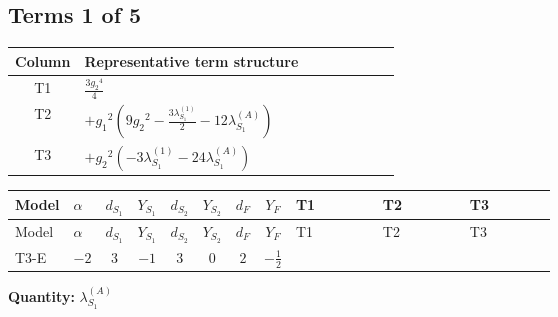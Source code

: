 \documentclass[8pt]{article}
\begin{document}
\begin{landscape}
\subsection*{Terms 1 of 5}
\begin{center}
\begin{tabular}{@{}c >{\raggedright\arraybackslash}p{0.82\linewidth}@{}}
\toprule
Column & Representative term structure \\
\midrule
T1 & \(\displaystyle \frac{3 {g_2}^4}{4}\) \\
\midrule
T2 & \(\displaystyle +{g_1}^2 \left(9 {g_2}^2-\frac{3 {\lambda_{S_1}^{(1)}}}{2}-12 {\lambda_{S_1}^{(A)}}\right)\) \\
\midrule
T3 & \(\displaystyle +{g_2}^2 (-3 {\lambda_{S_1}^{(1)}}-24 {\lambda_{S_1}^{(A)}})\) \\
\midrule
\bottomrule
\end{tabular}
\end{center}
\smallskip
\tiny
\begin{longtable}{@{}llcccccc >{\raggedright\arraybackslash}p{0.21\linewidth} >{\raggedright\arraybackslash}p{0.21\linewidth} >{\raggedright\arraybackslash}p{0.21\linewidth}@{}}
\toprule
Model & $\alpha$ & $d_{S_1}$ & $Y_{S_1}$ & $d_{S_2}$ & $Y_{S_2}$ & $d_F$ & $Y_F$ & T1 & T2 & T3 \\
\midrule
\endfirsthead
\toprule
Model & $\alpha$ & $d_{S_1}$ & $Y_{S_1}$ & $d_{S_2}$ & $Y_{S_2}$ & $d_F$ & $Y_F$ & T1 & T2 & T3 \\
\midrule
\endhead
T3-E & $-2$ & $3$ & $-1$ & $3$ & $0$ & $2$ & $-\frac{1}{2}$ & \scriptsize\adjustbox{max width=\linewidth}{$\begin{gathered} \frac{3 {g_2}^4}{4}\end{gathered}$} & \scriptsize\adjustbox{max width=\linewidth}{$\begin{gathered} +{g_1}^2 \left(9 {g_2}^2-\frac{3 {\lambda_{S_1}^{(1)}}}{2}-12 {\lambda_{S_1}^{(A)}}\right)\end{gathered}$} & \scriptsize\adjustbox{max width=\linewidth}{$\begin{gathered} +{g_2}^2 (-3 {\lambda_{S_1}^{(1)}}-24 {\lambda_{S_1}^{(A)}})\end{gathered}$} \\
\midrule
\bottomrule
\end{longtable}
\clearpage
\noindent\textbf{Quantity: }$\lambda_{S_1}^{(A)}$\par\smallskip

\end{landscape}
\end{document}
